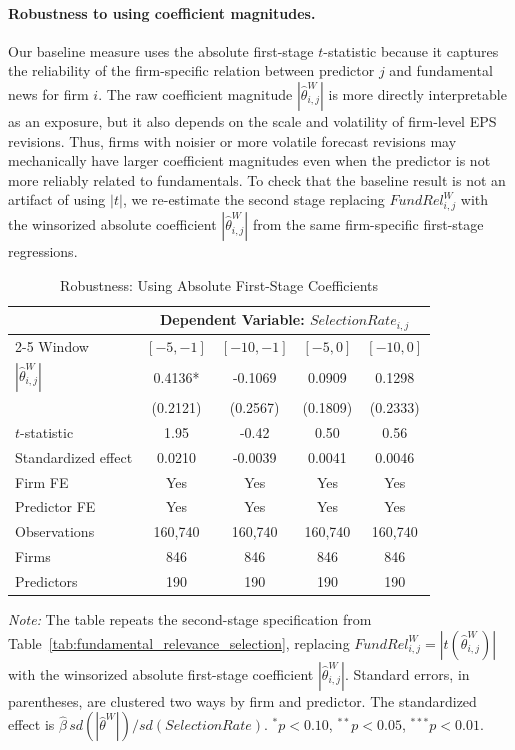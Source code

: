 \paragraph{Robustness to using coefficient magnitudes.}

Our baseline measure uses the absolute first-stage $t$-statistic because it captures the reliability of the firm-specific relation between predictor $j$ and fundamental news for firm $i$. The raw coefficient magnitude $|\hat\theta^W_{i,j}|$ is more directly interpretable as an exposure, but it also depends on the scale and volatility of firm-level EPS revisions. Thus, firms with noisier or more volatile forecast revisions may mechanically have larger coefficient magnitudes even when the predictor is not more reliably related to fundamentals. To check that the baseline result is not an artifact of using $|t|$, we re-estimate the second stage replacing $FundRel^W_{i,j}$ with the winsorized absolute coefficient $|\hat\theta^W_{i,j}|$ from the same firm-specific first-stage regressions.

\begin{table}[H]
\centering
\caption{Robustness: Using Absolute First-Stage Coefficients}
\label{tab:fundamental_relevance_selection_theta}
\begin{tabular}{lcccc}
\toprule
& \multicolumn{4}{c}{Dependent Variable: $SelectionRate_{i,j}$} \\
\cmidrule(lr){2-5}
Window & $[-5,-1]$ & $[-10,-1]$ & $[-5,0]$ & $[-10,0]$ \\
\midrule
$|\hat\theta^W_{i,j}|$
    & 0.4136* & -0.1069 & 0.0909 & 0.1298 \\
    & (0.2121) & (0.2567) & (0.1809) & (0.2333) \\
\midrule
$t$-statistic
    & 1.95 & -0.42 & 0.50 & 0.56 \\
Standardized effect
    & 0.0210 & -0.0039 & 0.0041 & 0.0046 \\
\midrule
Firm FE
    & Yes & Yes & Yes & Yes \\
Predictor FE
    & Yes & Yes & Yes & Yes \\
Observations
    & 160{,}740 & 160{,}740 & 160{,}740 & 160{,}740 \\
Firms
    & 846 & 846 & 846 & 846 \\
Predictors
    & 190 & 190 & 190 & 190 \\
\bottomrule
\end{tabular}

\vspace{0.15cm}
\begin{minipage}{0.95\textwidth}
\footnotesize
\textit{Note:} The table repeats the second-stage specification from Table~\ref{tab:fundamental_relevance_selection}, replacing $FundRel^W_{i,j}=|t(\hat\theta^W_{i,j})|$ with the winsorized absolute first-stage coefficient $|\hat\theta^W_{i,j}|$. Standard errors, in parentheses, are clustered two ways by firm and predictor. The standardized effect is $\hat\beta\,sd(|\hat\theta^W|)/sd(SelectionRate)$. $^{*}p<0.10$, $^{**}p<0.05$, $^{***}p<0.01$.
\end{minipage}
\end{table}


